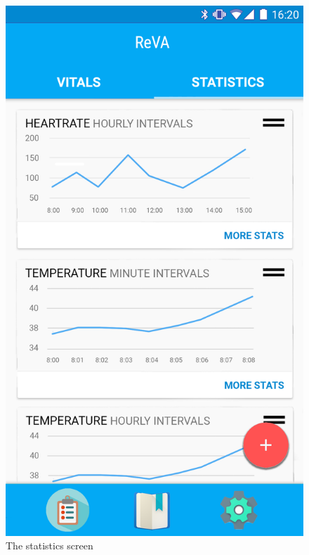 \begin{figure}
\begin{minipage}{.5\textwidth}
\end{minipage}%
\begin{minipage}{.5\textwidth}
  \centering
  \includegraphics[width=0.9\linewidth]{../images/UI/Statistics.png}
  \caption{\label{fig:statistic}The statistics screen}
\end{minipage}
\end{figure}



